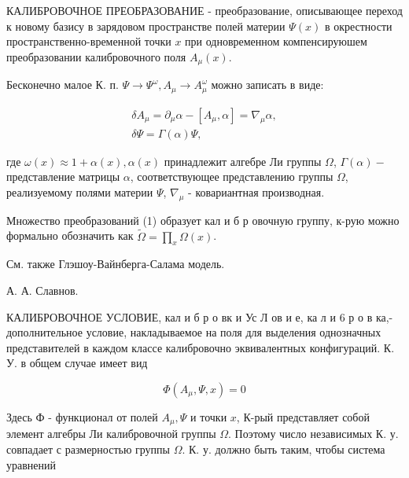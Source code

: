 \documentclass[10pt]{article}
\begin{document}
КАЛИБРОВОЧНОЕ ПРЕОБРАЗОВАНИЕ - преобразование, описывающее переход к новому базису в зарядовом пространстве полей материи $\Psi(x)$ в окрестности пространственно-временной точки $x$ при одновременном компенсируюшем преобразовании калибровочного поля $A_{\mu}(x)$.



Бесконечно малое К. п. $\Psi \rightarrow \Psi^{\omega}, A_{\mu} \rightarrow A_{\mu}^{\omega}$ можно записать в виде:



\[

\begin{gathered}

\delta A_{\mu}=\partial_{\mu} \alpha-\left[A_{\mu}, \alpha\right]=\nabla_{\mu} \alpha, \\

\delta \Psi=\Gamma(\alpha) \Psi,

\end{gathered}

\]



где $\omega(x) \approx 1+\alpha(x), \alpha(x)$ принадлежит алгебре Ли группы $\Omega$, $\Gamma(\alpha)-$ представление матрицы $\alpha$, соответствующее представлению группы $\Omega$, реализуемому полями материи $\Psi$, $\nabla_{\mu}$ - ковариантная производная.



Множество преобразований (1) образует кал и б р овочную группу, к-рую можно формально обозначить как $\tilde{\Omega}=\prod_{x} \Omega(x)$.



См. также Глэшоу-Вайнберга-Салама модель.



А. А. Славнов.



КАЛИБРОВОЧНОЕ УСЛОВИЕ, кал и б р о вк и Ус Л ов и е, ка л и 6 р о в ка,- дополнительное условие, накладываемое на поля для выделения однозначных представителей в каждом классе калибровочно эквивалентных конфигураций. К. У. в общем случае имеет вид



\[

\Phi\left(A_{\mu}, \Psi, x\right)=0

\]



Здесь Ф - функционал от полей $A_{\mu}, \Psi$ и точки $x$, К-рый представляет собой элемент алгебры Ли калибровочной группы $\Omega$. Поэтому число независимых К. у. совпадает с размерностью группы $\Omega$. К. у. должно быть таким, чтобы система уравнений
\end{document}
